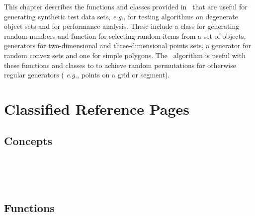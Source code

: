 
This chapter describes the functions and classes provided in \cgal\ that
are useful for generating synthetic test data sets, \textit{e.g.,} for 
testing algorithms on degenerate object sets and for performance analysis.
These include a class for generating random numbers and function for selecting
random items from a set of objects,
generators for two-dimensional and three-dimensional points sets, a generator
for random convex sets and one for simple polygons.  The \stl\ algorithm
 is useful with these functions and classes to
to achieve random permutations for otherwise regular generators (
\textit{e.g.}, points on a grid or segment).


\section{Classified Reference Pages}

\subsection*{Concepts}
 \\
 \\
 \\

\subsection*{Functions}

 \\
 \\
 \\
 \\
 \\
 \\
 \\
 \\
 \\

